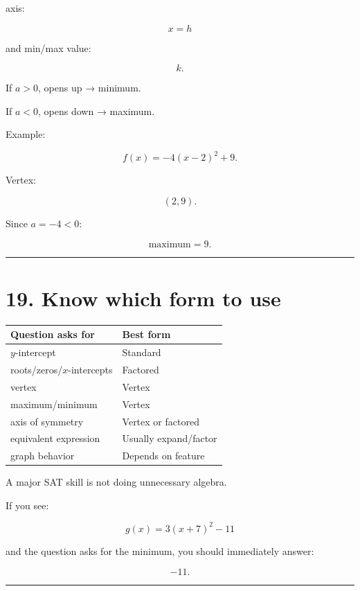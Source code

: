 \documentclass[
]{article}
\newcounter{none} %
\begin{document}
axis:

\[
\boxed{x=h}
\]

and min/max value:

\[
\boxed{k}.
\]

If \(a>0\), opens up → minimum.

If \(a<0\), opens down → maximum.

Example:

\[
f(x)=-4(x-2)^2+9.
\]

Vertex:

\[
(2,9).
\]

Since \(a=-4<0\):

\[
\boxed{\text{maximum}=9}.
\]

\begin{center}\rule{0.5\linewidth}{0.5pt}\end{center}

\section{19. Know which form to use}\label{know-which-form-to-use}

{\def\LTcaptype{none} %
\begin{longtable}[]{@{}ll@{}}
\toprule\noalign{}
Question asks for & Best form \\
\midrule\noalign{}
\endhead
\bottomrule\noalign{}
\endlastfoot
\(y\)-intercept & Standard \\
roots/zeros/\(x\)-intercepts & Factored \\
vertex & Vertex \\
maximum/minimum & Vertex \\
axis of symmetry & Vertex or factored \\
equivalent expression & Usually expand/factor \\
graph behavior & Depends on feature \\
\end{longtable}
}

A major SAT skill is not doing unnecessary algebra.

If you see:

\[
g(x)=3(x+7)^2-11
\]

and the question asks for the minimum, you should immediately answer:

\[
\boxed{-11}.
\]

\begin{center}\rule{0.5\linewidth}{0.5pt}\end{center}
\end{document}
